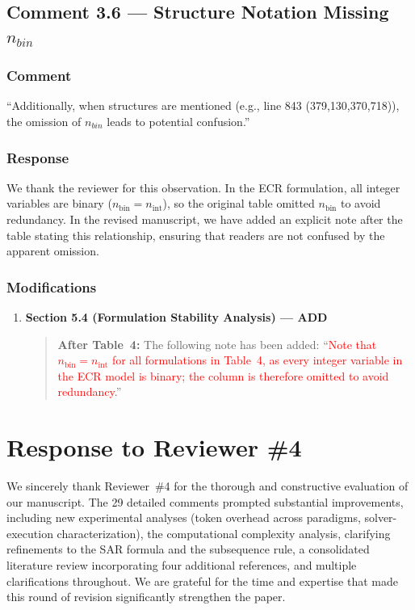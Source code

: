 \documentclass[11pt,a4paper]{article}
\begin{document}
\subsection{Comment 3.6 --- Structure Notation Missing $n_{bin}$}

\subsubsection{Comment}
``Additionally, when structures are mentioned (e.g., line 843 (379,130,370,718)), the omission of $n_{bin}$ leads to potential confusion.''

\subsubsection{Response}
We thank the reviewer for this observation. In the ECR formulation, all integer variables are binary ($n_{\text{bin}}=n_{\text{int}}$), so the original table omitted $n_{\text{bin}}$ to avoid redundancy. In the revised manuscript, we have added an explicit note after the table stating this relationship, ensuring that readers are not confused by the apparent omission.

\subsubsection{Modifications}
\begin{enumerate}
\item \textbf{Section 5.4 (Formulation Stability Analysis) --- ADD}
\begin{quote}
\textbf{After Table~4:} The following note has been added: ``\textcolor{red}{Note that $n_{\text{bin}}=n_{\text{int}}$ for all formulations in Table~4, as every integer variable in the ECR model is binary; the column is therefore omitted to avoid redundancy.}''
\end{quote}
\end{enumerate}


\section{Response to Reviewer \#4}

We sincerely thank Reviewer~\#4 for the thorough and constructive evaluation of our manuscript. The 29 detailed comments prompted substantial improvements, including new experimental analyses (token overhead across paradigms, solver-execution characterization), the computational complexity analysis, clarifying refinements to the SAR formula and the subsequence rule, a consolidated literature review incorporating four additional references, and multiple clarifications throughout. We are grateful for the time and expertise that made this round of revision significantly strengthen the paper.
\end{document}
